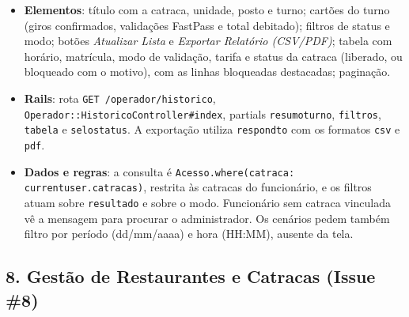 \documentclass[a4paper,12pt]{article}
\renewcommand{\_}{\textunderscore\allowbreak}
\begin{document}
\begin{itemize}

    \item \textbf{Elementos}: título com a catraca, unidade, posto e turno; cartões do turno (giros confirmados, validações FastPass e total debitado); filtros de status e modo; botões \textit{Atualizar Lista} e \textit{Exportar Relatório (CSV/PDF)}; tabela com horário, matrícula, modo de validação, tarifa e status da catraca (liberado, ou bloqueado com o motivo), com as linhas bloqueadas destacadas; paginação.

    \item \textbf{Rails}: rota \texttt{GET /operador/\allowbreak{}historico}, \texttt{Operador::\allowbreak{}HistoricoController\#\allowbreak{}index}, partials \texttt{\_resumo\_turno}, \texttt{\_filtros}, \texttt{\_tabela} e \texttt{\_selo\_status}. A exportação utiliza \texttt{respond\_to} com os formatos \texttt{csv} e \texttt{pdf}.

    \item \textbf{Dados e regras}: a consulta é \texttt{Acesso.\allowbreak{}where(catraca: current\_user.\allowbreak{}catracas)}, restrita às catracas do funcionário, e os filtros atuam sobre \texttt{resultado} e sobre o modo. Funcionário sem catraca vinculada vê a mensagem para procurar o administrador. Os cenários pedem também filtro por período (dd/\allowbreak{}mm/\allowbreak{}aaaa) e hora (HH:MM), ausente da tela.

\end{itemize}

\subsection*{8. Gestão de Restaurantes e Catracas (Issue \#8)}
\end{document}
